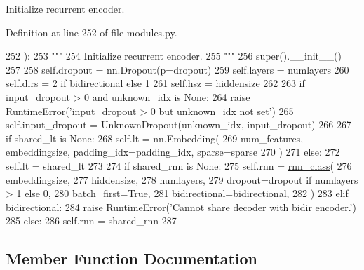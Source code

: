 \begin{DoxyVerb}Initialize recurrent encoder.
\end{DoxyVerb}
 

Definition at line 252 of file modules.\+py.


\begin{DoxyCode}
252     ):
253         \textcolor{stringliteral}{"""}
254 \textcolor{stringliteral}{        Initialize recurrent encoder.}
255 \textcolor{stringliteral}{        """}
256         super().\_\_init\_\_()
257 
258         self.dropout = nn.Dropout(p=dropout)
259         self.layers = numlayers
260         self.dirs = 2 \textcolor{keywordflow}{if} bidirectional \textcolor{keywordflow}{else} 1
261         self.hsz = hiddensize
262 
263         \textcolor{keywordflow}{if} input\_dropout > 0 \textcolor{keywordflow}{and} unknown\_idx \textcolor{keywordflow}{is} \textcolor{keywordtype}{None}:
264             \textcolor{keywordflow}{raise} RuntimeError(\textcolor{stringliteral}{'input\_dropout > 0 but unknown\_idx not set'})
265         self.input\_dropout = UnknownDropout(unknown\_idx, input\_dropout)
266 
267         \textcolor{keywordflow}{if} shared\_lt \textcolor{keywordflow}{is} \textcolor{keywordtype}{None}:
268             self.lt = nn.Embedding(
269                 num\_features, embeddingsize, padding\_idx=padding\_idx, sparse=sparse
270             )
271         \textcolor{keywordflow}{else}:
272             self.lt = shared\_lt
273 
274         \textcolor{keywordflow}{if} shared\_rnn \textcolor{keywordflow}{is} \textcolor{keywordtype}{None}:
275             self.rnn = \hyperlink{namespaceseq2seq_1_1train_a46177da1cc74c4a2874e4a527d857f75}{rnn\_class}(
276                 embeddingsize,
277                 hiddensize,
278                 numlayers,
279                 dropout=dropout \textcolor{keywordflow}{if} numlayers > 1 \textcolor{keywordflow}{else} 0,
280                 batch\_first=\textcolor{keyword}{True},
281                 bidirectional=bidirectional,
282             )
283         \textcolor{keywordflow}{elif} bidirectional:
284             \textcolor{keywordflow}{raise} RuntimeError(\textcolor{stringliteral}{'Cannot share decoder with bidir encoder.'})
285         \textcolor{keywordflow}{else}:
286             self.rnn = shared\_rnn
287 
\end{DoxyCode}


\subsection{Member Function Documentation}
\mbox{\label{classparlai_1_1agents_1_1seq2seq_1_1modules_1_1RNNEncoder_a4ae3d043b7a381e0eb89eb5460217029}} 
